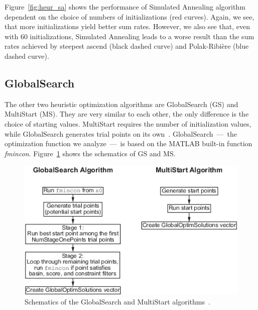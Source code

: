 Figure~\ref{fig:heur_sa} shows the performance of Simulated Annealing algorithm dependent on the choice of numbers of initializations (red curves).
Again, we see, that more initializations yield better sum rates.
However, we also see that, even with 60 initializations, Simulated Annealing leads to a worse result than the sum rates achieved by steepest ascend (black dashed curve) and Polak-Ribi\`{e}re (blue dashed curve).


\subsection{GlobalSearch}
\label{sec:globals}
The other two heuristic optimization algorithms are GlobalSearch (GS) and MultiStart (MS).
They are very similar to each other, the only difference is the choice of starting values.
MultiStart requires the number of initialization values, while GlobalSearch generates trial points on its own~\cite{matlab:gloabls}.
GlobalSearch~---~the optimization function we analyze~---~is based on the MATLAB built-in function \textit{fmincon}.
Figure~\ref{fig:globals_scheme} shows the schematics of GS and MS.
\begin{figure}[h]
\centering
  \includegraphics[width=0.8\linewidth]{images/global_algorithm.png}
\caption{Schematics of the GlobalSearch and MultiStart algorithms~\cite{matlab:gloabls}.}
\label{fig:globals_scheme}
\end{figure}

